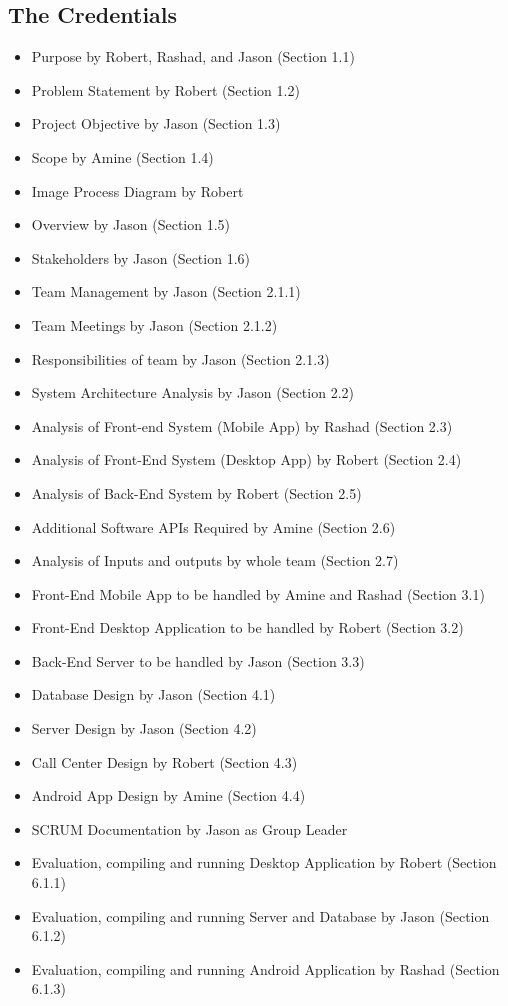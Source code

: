 \documentclass[a4paper,12pt]{article}
\begin{document}
\subsection{The Credentials}
\begin{itemize}
\setlength\itemsep{0em}
\item Purpose by Robert, Rashad, and Jason (Section 1.1)
\item Problem Statement by Robert (Section 1.2)
\item Project Objective by Jason (Section 1.3)
\item Scope by Amine (Section 1.4)
\item Image Process Diagram by Robert
\item Overview by Jason (Section 1.5)
\item Stakeholders by Jason (Section 1.6)
\item Team Management by Jason (Section 2.1.1)
\item Team Meetings by Jason (Section 2.1.2)
\item Responsibilities of team by Jason (Section 2.1.3)
\item System Architecture Analysis by Jason (Section 2.2)
\item Analysis of Front-end System (Mobile App) by Rashad (Section 2.3)
\item Analysis of Front-End System (Desktop App) by Robert (Section 2.4)
\item Analysis of Back-End System by Robert (Section 2.5)
\item Additional Software APIs Required by Amine (Section 2.6)
\item Analysis of Inputs and outputs by whole team (Section 2.7)
\item Front-End Mobile App to be handled by Amine and Rashad (Section 3.1)
\item Front-End Desktop Application to be handled by Robert (Section 3.2)
\item Back-End Server to be handled by Jason (Section 3.3)
\item Database Design by Jason (Section 4.1)
\item Server Design by Jason (Section 4.2)
\item Call Center Design by Robert (Section 4.3)
\item Android App Design by Amine (Section 4.4)
\item SCRUM Documentation by Jason as Group Leader
\item Evaluation, compiling and running Desktop Application by Robert (Section 6.1.1)
\item Evaluation, compiling and running Server and Database by Jason (Section 6.1.2)
\item Evaluation, compiling and running Android Application by Rashad (Section 6.1.3)


\end{itemize}
\end{document}
